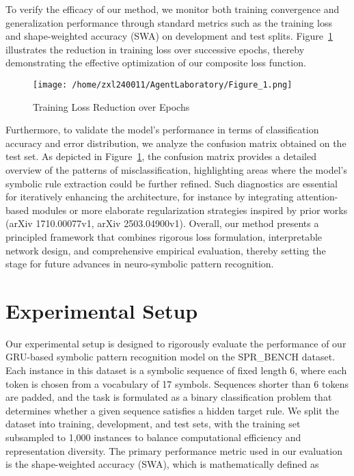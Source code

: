 \documentclass[12pt]{article}
\begin{document}
To verify the efficacy of our method, we monitor both training convergence and generalization performance through standard metrics such as the training loss and shape-weighted accuracy (SWA) on development and test splits. Figure~\ref{fig:fig1} illustrates the reduction in training loss over successive epochs, thereby demonstrating the effective optimization of our composite loss function. 
\begin{figure}[h]
\caption{Training Loss Reduction over Epochs}
\centering
\texttt{[image: /home/zxl240011/AgentLaboratory/Figure\_1.png]}
\label{fig:fig1}
\end{figure}

Furthermore, to validate the model’s performance in terms of classification accuracy and error distribution, we analyze the confusion matrix obtained on the test set. As depicted in Figure~\ref{fig:fig1}, the confusion matrix provides a detailed overview of the patterns of misclassification, highlighting areas where the model’s symbolic rule extraction could be further refined. Such diagnostics are essential for iteratively enhancing the architecture, for instance by integrating attention-based modules or more elaborate regularization strategies inspired by prior works (arXiv 1710.00077v1, arXiv 2503.04900v1). Overall, our method presents a principled framework that combines rigorous loss formulation, interpretable network design, and comprehensive empirical evaluation, thereby setting the stage for future advances in neuro-symbolic pattern recognition.

\section{Experimental Setup}
Our experimental setup is designed to rigorously evaluate the performance of our GRU-based symbolic pattern recognition model on the SPR\_BENCH dataset. Each instance in this dataset is a symbolic sequence of fixed length 6, where each token is chosen from a vocabulary of 17 symbols. Sequences shorter than 6 tokens are padded, and the task is formulated as a binary classification problem that determines whether a given sequence satisfies a hidden target rule. We split the dataset into training, development, and test sets, with the training set subsampled to 1,000 instances to balance computational efficiency and representation diversity. The primary performance metric used in our evaluation is the shape-weighted accuracy (SWA), which is mathematically defined as
\end{document}

